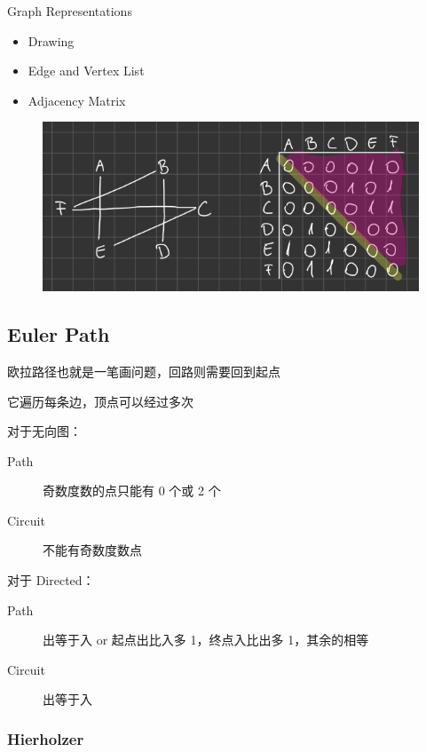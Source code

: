 \documentclass[11pt,journal,compsoc]{IEEEtran}
\begin{document}
Graph Representations

\begin{itemize}
    \item Drawing
    \item Edge and Vertex List
    \item Adjacency Matrix
\end{itemize}

\begin{figure}
    \centering
    \includegraphics[width=\linewidth]{1.png}
\end{figure}


\subsection{Euler Path}

欧拉路径也就是一笔画问题，回路则需要回到起点

它遍历每条边，顶点可以经过多次

对于无向图：

\begin{description}
    \item[Path] 奇数度数的点只能有 0 个或 2 个

    \item[Circuit] 不能有奇数度数点
\end{description}

对于 Directed：

\begin{description}
    \item[Path] 出等于入 or 起点出比入多 1，终点入比出多 1，其余的相等

    \item[Circuit] 出等于入
\end{description}


\subsubsection{Hierholzer}
\end{document}
